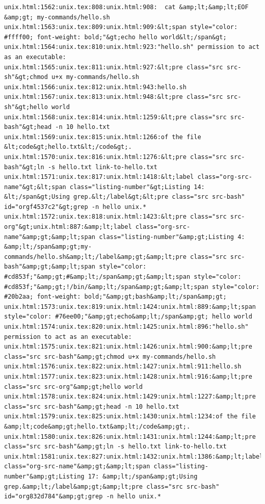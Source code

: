 \documentclass[11pt]{article}
\begin{document}
\begin{verbatim}
unix.html:1562:unix.tex:808:unix.html:908:  cat &amp;lt;&amp;lt;EOF &amp;gt; my-commands/hello.sh
unix.html:1563:unix.tex:809:unix.html:909:&lt;span style="color: #ffff00; font-weight: bold;"&gt;echo hello world&lt;/span&gt;
unix.html:1564:unix.tex:810:unix.html:923:"hello.sh" permission to act as an executable:
unix.html:1565:unix.tex:811:unix.html:927:&lt;pre class="src src-sh"&gt;chmod u+x my-commands/hello.sh
unix.html:1566:unix.tex:812:unix.html:943:hello.sh
unix.html:1567:unix.tex:813:unix.html:948:&lt;pre class="src src-sh"&gt;hello world
unix.html:1568:unix.tex:814:unix.html:1259:&lt;pre class="src src-bash"&gt;head -n 10 hello.txt
unix.html:1569:unix.tex:815:unix.html:1266:of the file &lt;code&gt;hello.txt&lt;/code&gt;.
unix.html:1570:unix.tex:816:unix.html:1276:&lt;pre class="src src-bash"&gt;ln -s hello.txt link-to-hello.txt
unix.html:1571:unix.tex:817:unix.html:1418:&lt;label class="org-src-name"&gt;&lt;span class="listing-number"&gt;Listing 14: &lt;/span&gt;Using grep.&lt;/label&gt;&lt;pre class="src src-bash" id="orgf4537c2"&gt;grep -n hello unix.*
unix.html:1572:unix.tex:818:unix.html:1423:&lt;pre class="src src-org"&gt;unix.html:887:&amp;lt;label class="org-src-name"&amp;gt;&amp;lt;span class="listing-number"&amp;gt;Listing 4: &amp;lt;/span&amp;gt;my-commands/hello.sh&amp;lt;/label&amp;gt;&amp;lt;pre class="src src-bash"&amp;gt;&amp;lt;span style="color: #cd853f;"&amp;gt;#&amp;lt;/span&amp;gt;&amp;lt;span style="color: #cd853f;"&amp;gt;!/bin/&amp;lt;/span&amp;gt;&amp;lt;span style="color: #20b2aa; font-weight: bold;"&amp;gt;bash&amp;lt;/span&amp;gt;
unix.html:1573:unix.tex:819:unix.html:1424:unix.html:889:&amp;lt;span style="color: #76ee00;"&amp;gt;echo&amp;lt;/span&amp;gt; hello world
unix.html:1574:unix.tex:820:unix.html:1425:unix.html:896:"hello.sh" permission to act as an executable:
unix.html:1575:unix.tex:821:unix.html:1426:unix.html:900:&amp;lt;pre class="src src-bash"&amp;gt;chmod u+x my-commands/hello.sh
unix.html:1576:unix.tex:822:unix.html:1427:unix.html:911:hello.sh
unix.html:1577:unix.tex:823:unix.html:1428:unix.html:916:&amp;lt;pre class="src src-org"&amp;gt;hello world
unix.html:1578:unix.tex:824:unix.html:1429:unix.html:1227:&amp;lt;pre class="src src-bash"&amp;gt;head -n 10 hello.txt
unix.html:1579:unix.tex:825:unix.html:1430:unix.html:1234:of the file &amp;lt;code&amp;gt;hello.txt&amp;lt;/code&amp;gt;.
unix.html:1580:unix.tex:826:unix.html:1431:unix.html:1244:&amp;lt;pre class="src src-bash"&amp;gt;ln -s hello.txt link-to-hello.txt
unix.html:1581:unix.tex:827:unix.html:1432:unix.html:1386:&amp;lt;label class="org-src-name"&amp;gt;&amp;lt;span class="listing-number"&amp;gt;Listing 17: &amp;lt;/span&amp;gt;Using grep.&amp;lt;/label&amp;gt;&amp;lt;pre class="src src-bash" id="org832d784"&amp;gt;grep -n hello unix.*

\end{verbatim}
\end{document}
